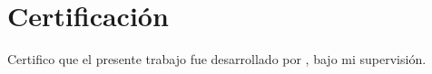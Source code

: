 \chapter*{Certificación}

Certifico que el presente trabajo fue desarrollado por \theauthor, bajo mi
supervisión.
